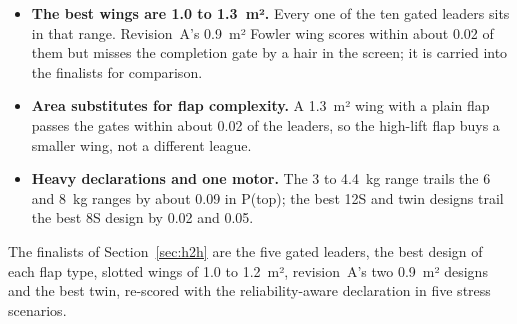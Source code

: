 \begin{itemize}
\item \textbf{The best wings are 1.0 to 1.3~m².} Every one of the ten gated leaders sits in that range. Revision~A's 0.9~m² Fowler wing scores within about 0.02 of them but misses the completion gate by a hair in the screen; it is carried into the finalists for comparison.
\item \textbf{Area substitutes for flap complexity.} A 1.3~m² wing with a plain flap passes the gates within about 0.02 of the leaders, so the high-lift flap buys a smaller wing, not a different league.
\item \textbf{Heavy declarations and one motor.} The 3 to 4.4~kg range trails the 6 and 8~kg ranges by about 0.09 in P(top); the best 12S and twin designs trail the best 8S design by 0.02 and 0.05.
\end{itemize}

The  finalists of Section~\ref{sec:h2h} are the five gated leaders, the best design of each flap type, slotted wings of 1.0 to 1.2~m², revision~A's two 0.9~m² designs and the best twin, re-scored with the reliability-aware declaration in five stress scenarios.
